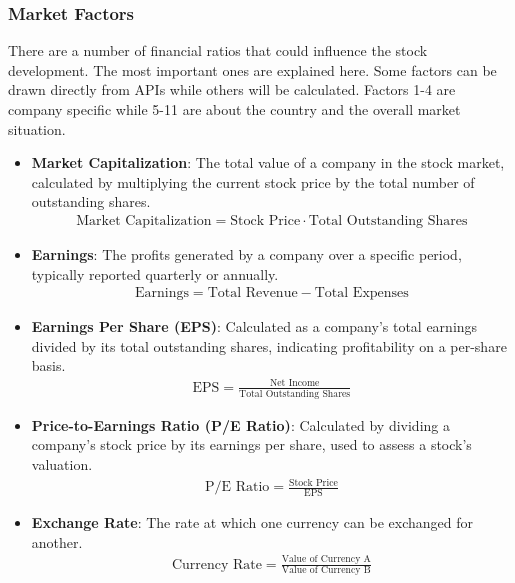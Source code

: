 \subsubsection{Market Factors}\label{sec: Market Faktors}
There are a number of financial ratios that could influence the stock development. The most important ones are explained here.
Some factors can be drawn directly from \ac{API}s while others will be calculated. Factors 1-4 are company specific while 5-11 are about the country and the overall market situation.\\
\begin{itemize}
	\item \textbf{Market Capitalization}: The total value of a company in the stock market, calculated by multiplying the current stock price by the total number of outstanding shares.
	\begin{align}\text{Market Capitalization} = \text{Stock Price} \cdot \text{Total Outstanding Shares} \end{align}

	
	\item \textbf{Earnings}: The profits generated by a company over a specific period, typically reported quarterly or annually.
	\begin{align} \text{Earnings} = \text{Total Revenue} - \text{Total Expenses} \end{align}
			
	\item \textbf{Earnings Per Share (EPS)}: Calculated as a company's total earnings divided by its total outstanding shares, indicating profitability on a per-share basis.
	\begin{align} \text{EPS} = \frac{\text{Net Income}}{\text{Total Outstanding Shares}} \end{align}
	
	\item \textbf{Price-to-Earnings Ratio (P/E Ratio)}: Calculated by dividing a company's stock price by its earnings per share, used to assess a stock's valuation.
	\begin{align} \text{P/E Ratio} = \frac{\text{Stock Price}}{\text{EPS}} \end{align}
	
	\item \textbf{Exchange Rate}: The rate at which one currency can be exchanged for another.
	\begin{align} \text{Currency Rate} = \frac{\text{Value of Currency A}}{\text{Value of Currency B}} \end{align}
	

\end{itemize}
